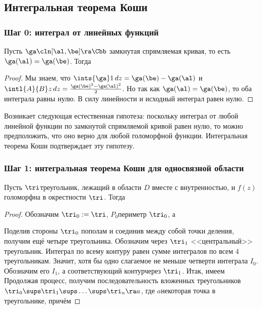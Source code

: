 \documentclass[a4paper]{article}
\begin{document}
\begin{solution}
\subsection{Интегральная теорема Коши}

\subsubsection{Шаг 0: интеграл от линейных функций}

\begin{stm}
Пусть $\ga\cln[\al,\be]\ra\Cbb$ замкнутая спрямляемая кривая, то есть $\ga(\al)=\ga(\be)$. Тогда
\end{stm}
\begin{proof}
Мы знаем, что $\ints{\ga}1\,dz = \ga(\be)-\ga(\al)$ и $\intl{A}{B} z\,dz = \frac{\ga(\be)^2 - \ga(\al)^2}{2}$.
Но так как $\ga(\al) =\ga(\be)$, то оба интеграла равны нулю. В силу линейности и исходный интеграл равен нулю.
\end{proof}

Возникает следующая естественная гипотеза: поскольку интеграл от любой линейной функции по замкнутой спрямляемой кривой
равен нулю, то можно предположить, что оно верно для любой голоморфной функции.
Интегральная теорема Коши подтверждает эту гипотезу.

\subsubsection{Шаг 1: интегральная теорема Коши для односвязной области}

\begin{lemma}[Гурса]
Пусть $\tri$\т треугольник, лежащий в области $D$ вместе с внутренностью, и $f(z)$ голоморфна в
окрестности $\tri$. Тогда
\end{lemma}
\begin{proof}
Обозначим $\tri_0 := \tri$, $P_0$\т периметр $\tri_0$, а

\hangindent=-40mm
Поделив стороны $\tri_{0}$ пополам и соединив между собой точки деления, получим ещё четыре треугольника.
Обозначим через $\tri_1$ <<центральный>> треугольник. Интеграл по всему контуру равен сумме интегралов
по всем $4$ треугольникам. Значит, хотя бы одно слагаемое не меньше четверти интеграла $I_0$. Обозначим его $I_1$,
а соответствующий контур\т через $\tri_1$. Итак, имеем
Продолжая процесс, получим последовательность вложенных треугольников
$\tri_0 \sups \tri_1 \sups \ldots \sups \tri_n \ra a$, где $a$\т некоторая точка в треугольнике, причём


\end{proof}
\end{solution}
\end{document}
